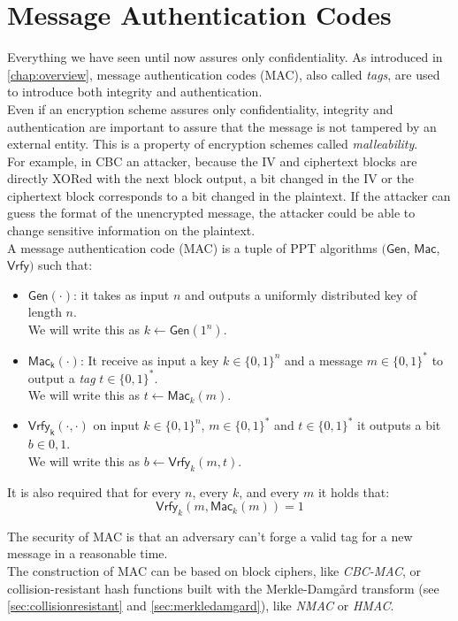 \section{Message Authentication Codes}\label{sec:mac}
Everything we have seen until now assures only confidentiality. As introduced in \autoref{chap:overview}, message authentication codes (MAC), also called \emph{tags}, are used to introduce both integrity and authentication.\\
Even if an encryption scheme assures only confidentiality, integrity and authentication are important to assure that the message is not tampered by an external entity. This is a property of encryption schemes called \emph{malleability}.\\
For example, in CBC an attacker, because the IV and ciphertext blocks are directly XORed with the next block output, a bit changed in the IV or the ciphertext block corresponds to a bit changed in the plaintext. If the attacker can guess the format of the unencrypted message, the attacker could be able to change sensitive information on the plaintext.\\
A message authentication code (MAC) is a tuple of PPT algorithms $(\mathsf{Gen}$, $\mathsf{Mac}$, $\mathsf{Vrfy})$ such that:
\begin{itemize}
    \item{$\mathsf{Gen(\cdot)}$: it takes as input $n$ and outputs a uniformly distributed key of length $n$.\\We will write this as $k \leftarrow \mathsf{Gen}(1^n)$.}
    \item{$\mathsf{Mac_k(\cdot)}$: It receive as input a key $k \in \{0,1\}^n$ and a message $m \in \{0,1\}^{*}$ to output a \emph{tag} $t \in \{0,1\}^{*}$.\\We will write this as $t \leftarrow \mathsf{Mac}_k(m)$.}
    \item{$\mathsf{Vrfy_k(\cdot,\cdot)}$ on input $k \in \{0,1\}^n$, $m \in \{0,1\}^{*}$ and $t \in \{0,1\}^{*}$ it outputs a bit $b \in {0,1}$.\\We will write this as $b \leftarrow \mathsf{Vrfy}_k(m, t)$.}
\end{itemize}
It is also required that for every $n$, every $k$, and every $m$ it holds that:
$$
\mathsf{Vrfy}_k(m, \mathsf{Mac}_k(m)) = 1
$$

The security of MAC is that an adversary can't forge a valid tag for a new message in a reasonable time.\\
The construction of MAC can be based on block ciphers, like \emph{CBC-MAC}, or collision-resistant hash functions built with the Merkle-Damg\r{a}rd transform (see \autoref{sec:collisionresistant} and \autoref{sec:merkledamgard}), like \emph{NMAC} or \emph{HMAC}.

